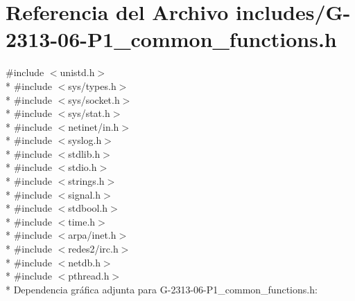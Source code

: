 \hypertarget{G-2313-06-P1__common__functions_8h}{}\section{Referencia del Archivo includes/\+G-\/2313-\/06-\/\+P1\+\_\+common\+\_\+functions.h}
\label{G-2313-06-P1__common__functions_8h}
{\ttfamily \#include $<$unistd.\+h$>$}\\*
{\ttfamily \#include $<$sys/types.\+h$>$}\\*
{\ttfamily \#include $<$sys/socket.\+h$>$}\\*
{\ttfamily \#include $<$sys/stat.\+h$>$}\\*
{\ttfamily \#include $<$netinet/in.\+h$>$}\\*
{\ttfamily \#include $<$syslog.\+h$>$}\\*
{\ttfamily \#include $<$stdlib.\+h$>$}\\*
{\ttfamily \#include $<$stdio.\+h$>$}\\*
{\ttfamily \#include $<$strings.\+h$>$}\\*
{\ttfamily \#include $<$signal.\+h$>$}\\*
{\ttfamily \#include $<$stdbool.\+h$>$}\\*
{\ttfamily \#include $<$time.\+h$>$}\\*
{\ttfamily \#include $<$arpa/inet.\+h$>$}\\*
{\ttfamily \#include $<$redes2/irc.\+h$>$}\\*
{\ttfamily \#include $<$netdb.\+h$>$}\\*
{\ttfamily \#include $<$pthread.\+h$>$}\\*
Dependencia gráfica adjunta para G-\/2313-\/06-\/\+P1\+\_\+common\+\_\+functions.h\+:
